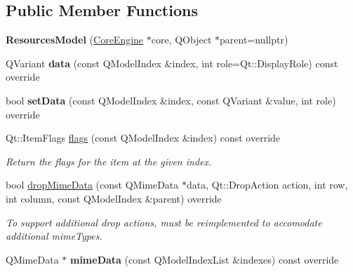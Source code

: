 \subsection*{Public Member Functions}
\begin{DoxyCompactItemize}
\item 
\mbox{\label{classrev_1_1_view_1_1_resources_model_aaa4f82f8a178d8c2c0aba7a5d26e361e}} 
{\bfseries Resources\+Model} (\mbox{\hyperlink{classrev_1_1_core_engine}{Core\+Engine}} $\ast$core, Q\+Object $\ast$parent=nullptr)
\item 
\mbox{\label{classrev_1_1_view_1_1_resources_model_abc573e0a41a33bdabd98ea8b01ab882b}} 
Q\+Variant {\bfseries data} (const Q\+Model\+Index \&index, int role=Qt\+::\+Display\+Role) const override
\item 
\mbox{\label{classrev_1_1_view_1_1_resources_model_a37b56557e25010a0e239261d9e18507a}} 
bool {\bfseries set\+Data} (const Q\+Model\+Index \&index, const Q\+Variant \&value, int role) override
\item 
Qt\+::\+Item\+Flags \mbox{\hyperlink{classrev_1_1_view_1_1_resources_model_afc4f37a7dd3883f2cbbff6b2780a0736}{flags}} (const Q\+Model\+Index \&index) const override
\begin{DoxyCompactList}\small\item\em Return the flags for the item at the given index. \end{DoxyCompactList}\item 
bool \mbox{\hyperlink{classrev_1_1_view_1_1_resources_model_a993b8815a725f3d2ee66008992621f48}{drop\+Mime\+Data}} (const Q\+Mime\+Data $\ast$data, Qt\+::\+Drop\+Action action, int row, int column, const Q\+Model\+Index \&parent) override
\begin{DoxyCompactList}\small\item\em To support additional drop actions, must be reimplemented to accomodate additional mime\+Types. \end{DoxyCompactList}\item 
\mbox{\label{classrev_1_1_view_1_1_resources_model_ad8ee9febcd537ccd108cbc0b02ec0e96}} 
Q\+Mime\+Data $\ast$ {\bfseries mime\+Data} (const Q\+Model\+Index\+List \&indexes) const override
\item 

\end{DoxyCompactItemize}
